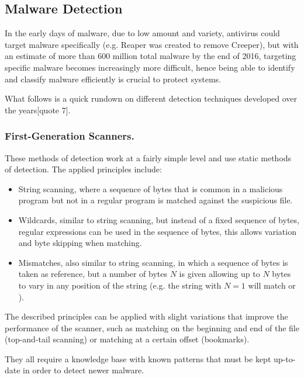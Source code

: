 \documentclass{llncs}
\begin{document}
\subsection{Malware Detection}\label{subsec:malware_detection}
In the early days of malware, due to low amount and variety, antivirus could target malware specifically (e.g. Reaper was created to remove Creeper), but with an estimate of more than 600 million total malware by the end of 2016, targeting specific malware becomes increasingly more difficult, hence being able to identify and classify malware efficiently is crucial to protect systems.

What follows is a quick rundown on different detection techniques developed over the years[quote 7].

\subsubsection{First-Generation Scanners.} These methods of detection work at a fairly simple level and use static methods of detection. The applied principles include:
\begin{itemize}
	\item String scanning, where a sequence of bytes that is common in a malicious program but not in a regular program is matched against the suspicious file.
	\item Wildcards, similar to string scanning, but instead of a fixed sequence of bytes, regular expressions can be used in the sequence of bytes, this allows variation and byte skipping when matching.
	\item Mismatches, also similar to string scanning, in which a sequence of bytes is taken as reference, but a number of bytes $N$ is given allowing up to $N$ bytes to vary in any position of the string (e.g. the string  with $N=1$ will match  or ).
\end{itemize}

The described principles can be applied with slight variations that improve the performance of the scanner, such as matching on the beginning and end of the file (top-and-tail scanning) or matching at a certain offset (bookmarks).

They all require a knowledge base with known patterns that must be kept up-to-date in order to detect newer malware.
\end{document}

